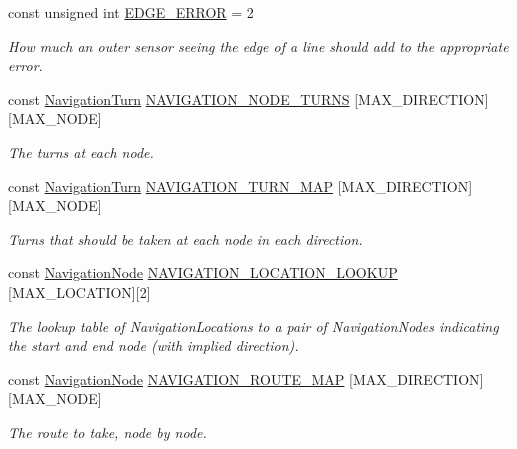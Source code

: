 \begin{DoxyCompactItemize}
const unsigned int \hyperlink{namespaceIDP_afa01378acc238f4bd41d8eb304f7afd7}{EDGE\_\-ERROR} = 2
\begin{DoxyCompactList}\small\item\em How much an outer sensor seeing the edge of a line should add to the appropriate error. \item\end{DoxyCompactList}\item 
const \hyperlink{namespaceIDP_ab8b8e9ff9f7de27da30c1fffaeef4b72}{NavigationTurn} \hyperlink{namespaceIDP_aa117cb76acf18e6af22830d5f2468ff4}{NAVIGATION\_\-NODE\_\-TURNS} \mbox{[}MAX\_\-DIRECTION\mbox{]}\mbox{[}MAX\_\-NODE\mbox{]}
\begin{DoxyCompactList}\small\item\em The turns at each node. \item\end{DoxyCompactList}\item 
const \hyperlink{namespaceIDP_ab8b8e9ff9f7de27da30c1fffaeef4b72}{NavigationTurn} \hyperlink{namespaceIDP_a0bada0608b684564e235786b3b38c10a}{NAVIGATION\_\-TURN\_\-MAP} \mbox{[}MAX\_\-DIRECTION\mbox{]}\mbox{[}MAX\_\-NODE\mbox{]}
\begin{DoxyCompactList}\small\item\em Turns that should be taken at each node in each direction. \item\end{DoxyCompactList}\item 
const \hyperlink{namespaceIDP_a286f26dda01010063dff761803b4cd16}{NavigationNode} \hyperlink{namespaceIDP_a33e1b72d66088b211bfeb61b18d7b63b}{NAVIGATION\_\-LOCATION\_\-LOOKUP} \mbox{[}MAX\_\-LOCATION\mbox{]}\mbox{[}2\mbox{]}
\begin{DoxyCompactList}\small\item\em The lookup table of NavigationLocations to a pair of NavigationNodes indicating the start and end node (with implied direction). \item\end{DoxyCompactList}\item 
const \hyperlink{namespaceIDP_a286f26dda01010063dff761803b4cd16}{NavigationNode} \hyperlink{namespaceIDP_a33ba7fcc78e0c8e5477d2ed6ac18e48f}{NAVIGATION\_\-ROUTE\_\-MAP} \mbox{[}MAX\_\-DIRECTION\mbox{]}\mbox{[}MAX\_\-NODE\mbox{]}
\begin{DoxyCompactList}\small\item\em The route to take, node by node. \item\end{DoxyCompactList}\end{DoxyCompactItemize}


